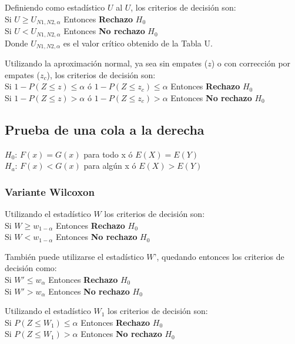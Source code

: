 \documentclass[]{book}
\theoremstyle{definition}
\theoremstyle{definition}
\theoremstyle{definition}
\theoremstyle{remark}
\begin{document}
Definiendo como estadístico \(U\) al \(U\), los criterios de decisión
son:\\
Si \(U≥U_{N1,N2,\alpha}\) Entonces \textbf{Rechazo} \(H_0\)\\
Si \(U<U_{N1,N2,\alpha}\) Entonces \textbf{No rechazo} \(H_0\)\\
Donde \(U_{N1,N2,\alpha}\) es el valor crítico obtenido de la Tabla U.

Utilizando la aproximación normal, ya sea sin empates (\(z\)) o con
corrección por empates (\(z_c\)), los criterios de decisión son:\\
Si \(1-P(Z\le z)\le\alpha\) ó \(1-P(Z≤z_c )\le\alpha\) Entonces
\textbf{Rechazo} \(H_0\)\\
Si \(1-P(Z≤z)>\alpha\) ó \(1-P(Z≤z_c )>\alpha\) Entonces \textbf{No
rechazo} \(H_0\)

\hypertarget{prueba-de-una-cola-a-la-derecha}{%
\subsection{Prueba de una cola a la
derecha}\label{prueba-de-una-cola-a-la-derecha}}

\(H_0\): \(F(x)=G(x)\) para todo x ó \(E(X)=E(Y)\)\\
\(H_a\): \(F(x)<G(x)\) para algún x ó \(E(X)>E(Y)\)

\hypertarget{variante-wilcoxon-2}{%
\subsubsection{Variante Wilcoxon}\label{variante-wilcoxon-2}}

Utilizando el estadístico \(W\) los criterios de decisión son:\\
Si \(W≥w_{1-\alpha}\) Entonces \textbf{Rechazo} \(H_0\)\\
Si \(W<w_{1-\alpha}\) Entonces \textbf{No rechazo} \(H_0\)

También puede utilizarse el estadístico \(W’\), quedando entonces los
criterios de decisión como:\\
Si \(W'≤w_\alpha\) Entonces \textbf{Rechazo} \(H_0\)\\
Si \(W'>w_\alpha\) Entonces \textbf{No rechazo} \(H_0\)

Utilizando el estadístico \(W_1\) los criterios de decisión son:\\
Si \(P(Z≤W_1 )≤ \alpha\) Entonces \textbf{Rechazo} \(H_0\)\\
Si \(P(Z≤W_1 )> \alpha\) Entonces \textbf{No rechazo} \(H_0\)
\end{document}
